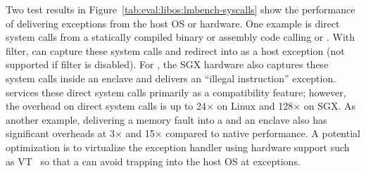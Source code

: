 Two test results in Figure~\ref{tab:eval:libos:lmbench-syscalls}
show the performance of delivering exceptions from the host OS or hardware.
One example is direct system calls from a statically
compiled binary
or assembly code calling  or .
With \seccomp{} filter,
\graphene{} can capture these system calls and redirect into \thelibos{} as a host exception (not supported if \seccomp{} filter is disabled).
For \graphenesgx{},
the SGX hardware also captures these system calls
inside an enclave
and delivers an
``illegal instruction'' exception.
\graphene{} services these direct system calls primarily as a compatibility feature;
however, the overhead on direct system calls
is up to 24$\times$ on Linux and 128$\times$ on SGX.
As another example,
delivering a memory fault
into a \picoproc{} and an enclave also has significant overheads at 3$\times$ and 15$\times$ compared to native performance.
A potential optimization
is to virtualize the exception handler using hardware support such as VT~\cite{VT} so that a \libos{} can avoid trapping
into the host OS
at exceptions.















